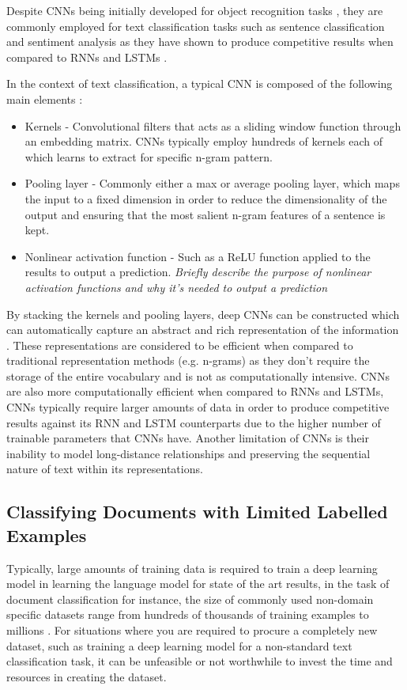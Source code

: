 \documentclass[a4paper,twoside,phd]{BYUPhys}
\begin{document}
Despite CNNs being initially developed for object recognition tasks \cite{LeCun1999}, they are commonly employed for text classification tasks such as sentence classification and sentiment analysis as they have shown to produce competitive results when compared to RNNs and LSTMs \cite{Collobert2011} \cite{Kim} \cite{Nogueira}. \newline

In the context of text classification, a typical CNN is composed of the following main elements \cite{Young}:

\begin{itemize}
	\item Kernels - Convolutional filters that acts as a sliding window function through an embedding matrix. CNNs typically employ hundreds of kernels each of which learns to extract for specific n-gram pattern.
	\item Pooling layer - Commonly either a max or average pooling layer, which maps the input to a fixed dimension in order to reduce the dimensionality of the output and ensuring that the most salient n-gram features of a sentence is kept.
	\item Nonlinear activation function - Such as a ReLU function applied to the results to output a prediction. \textit{Briefly describe the purpose of nonlinear activation functions and why it's needed to output a prediction}
\end{itemize}

By stacking the kernels and pooling layers, deep CNNs can be constructed which can automatically capture an abstract and rich representation of the information \cite{Young}. These representations are considered to be efficient when compared to traditional representation methods (e.g. n-grams) as they don't require the storage of the entire vocabulary and is not as computationally intensive. CNNs are also more computationally efficient when compared to RNNs and LSTMs, CNNs typically require larger amounts of data in order to produce competitive results against its RNN and LSTM counterparts due to the higher number of trainable parameters that CNNs have. Another limitation of CNNs is their inability to model long-distance relationships and preserving the sequential nature of text within its representations.

\subsection{Classifying Documents with Limited Labelled Examples}
\label{sec:TransferLearning}
Typically, large amounts of training data is required to train a deep learning model in learning the language model for state of the art results, in the task of document classification for instance, the size of commonly used non-domain specific datasets range from hundreds of thousands of training examples to millions \cite{Conneau2017} \cite{Zhang}. For situations where you are required to procure a completely new dataset, such as training a deep learning model for a non-standard text classification task, it can be unfeasible  or not worthwhile to invest the time and resources in creating the dataset. 
\end{document}
